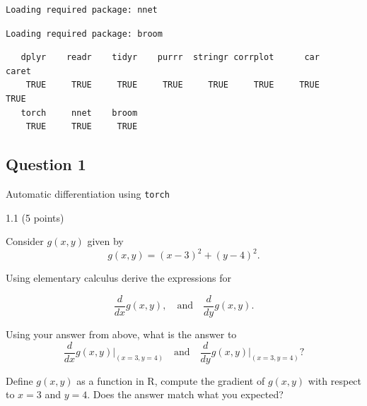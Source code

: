 \documentclass[
  letterpaper,
  DIV=11,
  numbers=noendperiod]{scrartcl}
\begin{document}
\begin{verbatim}
Loading required package: nnet
\end{verbatim}

\begin{verbatim}
Loading required package: broom
\end{verbatim}

\begin{verbatim}
   dplyr    readr    tidyr    purrr  stringr corrplot      car    caret 
    TRUE     TRUE     TRUE     TRUE     TRUE     TRUE     TRUE     TRUE 
   torch     nnet    broom 
    TRUE     TRUE     TRUE 
\end{verbatim}

\hypertarget{section}{%
\subsection{\texorpdfstring{}{    }}\label{section}}

\hypertarget{question-1}{%
\subsection{Question 1}\label{question-1}}

\begin{tcolorbox}[enhanced jigsaw, breakable, colframe=quarto-callout-tip-color-frame, bottomtitle=1mm, leftrule=.75mm, bottomrule=.15mm, arc=.35mm, titlerule=0mm, coltitle=black, colback=white, colbacktitle=quarto-callout-tip-color!10!white, opacitybacktitle=0.6, toptitle=1mm, opacityback=0, title=\textcolor{quarto-callout-tip-color}{\faLightbulb}\hspace{0.5em}{30 points}, toprule=.15mm, left=2mm, rightrule=.15mm]

Automatic differentiation using \texttt{torch}

\end{tcolorbox}

1.1 (5 points)

Consider \(g(x, y)\) given by \[
g(x, y) = (x - 3)^2 + (y - 4)^2.
\]

Using elementary calculus derive the expressions for

\[
\frac{d}{dx}g(x, y), \quad \text{and} \quad \frac{d}{dy}g(x, y).
\]

Using your answer from above, what is the answer to \[
\frac{d}{dx}g(x, y) \Bigg|_{(x=3, y=4)} \quad \text{and} \quad \frac{d}{dy}g(x, y) \Bigg|_{(x=3, y=4)} ?
\]

Define \(g(x, y)\) as a function in R, compute the gradient of
\(g(x, y)\) with respect to \(x=3\) and \(y=4\). Does the answer match
what you expected?
\end{document}

